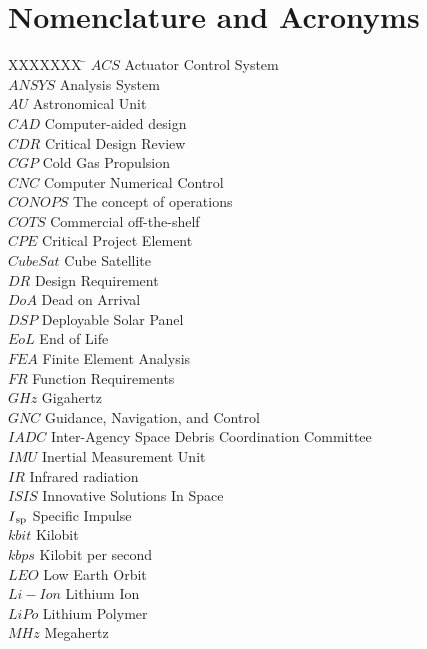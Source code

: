 \section*{Nomenclature and Acronyms}

\begin{tabbing}
  XXXXXXX \= \kill%
  $ACS$ \> Actuator Control System \\
  $ANSYS$ \> Analysis System \\
  $AU$ \> Astronomical Unit \\
  $CAD$ \> Computer-aided design \\
  $CDR$ \> Critical Design Review \\
  $CGP$ \> Cold Gas Propulsion \\
  $CNC$ \> Computer Numerical Control \\
  $CONOPS$ \> The concept of operations \\
  $COTS$ \> Commercial off-the-shelf \\
  $CPE$ \> Critical Project Element\\
  $CubeSat$ \> Cube Satellite \\
  $DR$ \> Design Requirement \\
  $DoA$ \> Dead on Arrival \\
  $DSP$ \> Deployable Solar Panel \\
  $EoL$ \> End of Life \\
  $FEA$ \> Finite Element Analysis \\
  $FR$ \> Function Requirements \\
  $GHz$ \> Gigahertz \\
  $GNC$ \> Guidance, Navigation, and Control \\
  $IADC$ \> Inter-Agency Space Debris Coordination Committee \\
  $IMU$ \> Inertial Measurement Unit \\
  $IR$ \> Infrared radiation \\
  $ISIS$ \> Innovative Solutions In Space \\
  $I\textsubscript{sp}$ \> Specific Impulse \\
  $kbit$ \> Kilobit \\
  $kbps$ \> Kilobit per second \\
  $LEO$ \> Low Earth Orbit \\
  $Li-Ion$ \> Lithium Ion \\
  $LiPo$ \> Lithium Polymer \\
  $MHz$ \> Megahertz \\

\end{tabbing}
